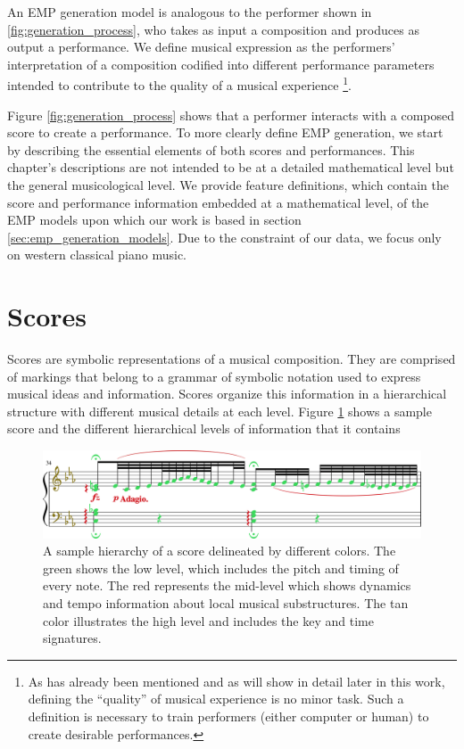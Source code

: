 An EMP generation model is analogous to the performer shown in \ref{fig:generation_process}, who takes as input a composition and produces as output a performance. We define musical expression as the performers' interpretation of a composition codified into different performance parameters intended to contribute to the quality of a musical experience%
\footnote{As has already been mentioned and as will show in detail later in this work, defining the ``quality'' of musical experience is no minor task. Such a definition is necessary to train performers (either computer or human) to create desirable performances.}. 

Figure \ref{fig:generation_process} shows that a performer interacts with a composed score to create a performance. To more clearly define EMP generation, we start by describing the essential elements of both scores and performances. This chapter's descriptions are not intended to be at a detailed mathematical level but the general musicological level. We provide feature definitions, which contain the score and performance information embedded at a mathematical level, of the EMP models upon which our work is based in section \ref{sec:emp_generation_models}.  Due to the constraint of our data, we focus only on western classical piano music. 

\section{Scores}\label{sec:scores}
Scores are symbolic representations of a musical composition. They are comprised of markings that belong to a grammar of symbolic notation used to express musical ideas and information. Scores organize this information in a hierarchical structure with different musical details at each level. Figure \ref{fig:score_hierarchy} shows a sample score and the different hierarchical levels of information that it contains

\begin{figure}[b]
    \centering
    \includegraphics[width=1\linewidth]{figs/ch2/score_hierarchy.jpg}
    \caption{A sample hierarchy of a score delineated by different colors. The green shows the low level, which includes the pitch and timing of every note. The red represents the mid-level which shows dynamics and tempo information about local musical substructures. The tan color illustrates the high level and includes the key and time signatures.}
    \label{fig:score_hierarchy}
\end{figure}



